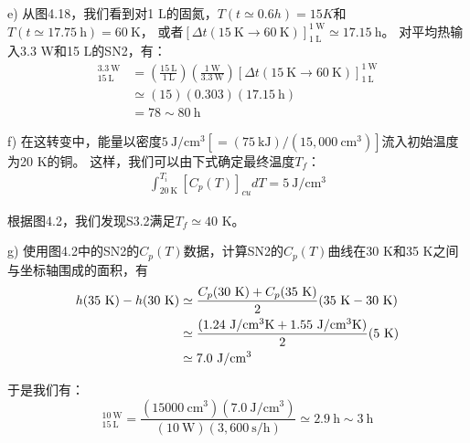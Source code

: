 e) 从图4.18，我们看到对1 L的固氮，$T(t\simeq 0.6 h)=15 K$和$T(t\simeq 17.75\ \mathrm{h}) = 60\ \mathrm{K}$，
或者$[\Delta t(15\ \mathrm{K}\rightarrow 60\ \mathrm{K})]_{1\ \mathrm{L}}^{1\ \mathrm{W}}\simeq 17.15\ \mathrm{h}$。
对平均热输入3.3 W和15 L的SN2，有：
\begin{align*}%
[\Delta t(15\ \mathrm{K} \rightarrow 60\ \mathrm{K})]_{15\ \mathrm{L}}^{3.3\ \mathrm{W}}&=\left(\frac{15\ \mathrm{L}}{1\ \mathrm{L}}\right)\left(\frac{1\ \mathrm{W}}{3.3\ \mathrm{W}}\right)\left[\Delta t(15\ \mathrm{K}\rightarrow 60\ \mathrm{K})\right]_{1\ \mathrm{L}}^{1\ \mathrm{W}}\\
&\simeq(15)(0.303)(17.15\ \mathrm{h})\\
&=78\sim 80\ \mathrm{h}
\end{align*}

f) 在这转变中，能量以密度$5\ \mathrm{J/cm^3}[= (75\ \mathrm{kJ})/(15,000\ \mathrm{cm^3})]$流入初始温度为20 K的铜。
这样，我们可以由下式确定最终温度$T_f$：
\begin{align*}%
\int_{20\ \mathrm{K}}^{T_i}[C_p(T)]_{cu}dT=5\ \mathrm{J/cm^3} \tag{S3.2}
\end{align*}

根据图4.2，我们发现S3.2满足$T_f\simeq 40$ K。

g) 使用图4.2中的SN2的$C_p(T)$数据，计算SN2的$C_p(T)$曲线在30 K和35 K之间
与坐标轴围成的面积，有
\begin{align*}%
h(35\ \mathrm{K})-h(30\ \mathrm{K})&\simeq\frac{C_p(30\ \mathrm{K})+C_p(35\ \mathrm{K})}{2}(35\ \mathrm{K}-30\ \mathrm{K})\\\notag
&\simeq\frac{(1.24\ \mathrm{J/cm^3 K}+1.55\ \mathrm{J/cm^3 K})}{2}(5\ \mathrm{K})\\\notag
&\simeq 7.0\ \mathrm{J/cm^3}
\end{align*}

于是我们有：
\begin{equation*}%
[\Delta t(30\ \mathrm{K} \rightarrow 35\ \mathrm{K})]_{15\ \mathrm{L}}^{10\ \mathrm{W}}=\frac{(15000\ \mathrm{cm^3})(7.0\ \mathrm{J/cm^3})}{(10\ \mathrm{W})(3,600\ \mathrm{s/h})}
\simeq 2.9\ \mathrm{h}\sim 3\ \mathrm{h}
\end{equation*}

